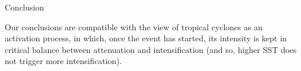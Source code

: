 \begin{block}{Conclusion}

	Our conclusions are compatible with the view of tropical cyclones as an activation process, in which, once the event has started, its intensity is kept in critical balance between attenuation and intensification (and so, higher SST does not trigger more intensification).
\end{block}
